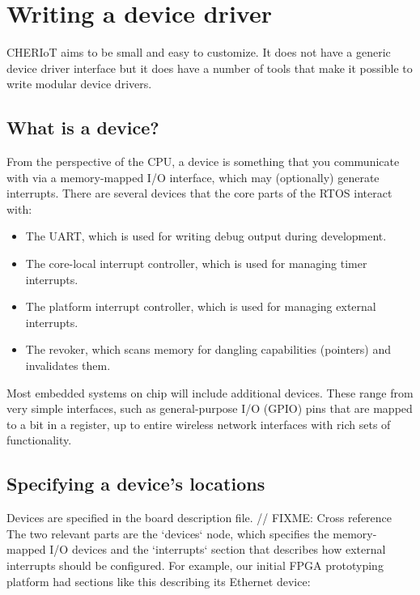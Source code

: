 \chapter{Writing a device driver}

CHERIoT aims to be small and easy to customize.
It does not have a generic device driver interface but it does have a number of tools that make it possible to write modular device drivers.

\section{What is a device?}

From the perspective of the CPU, a device is something that you communicate with via a memory-mapped I/O interface, which may (optionally) generate interrupts.
There are several devices that the core parts of the RTOS interact with:

\begin{itemize}
	\item{The UART, which is used for writing debug output during development.}
	\item{The core-local interrupt controller, which is used for managing timer interrupts.}
	\item{The platform interrupt controller, which is used for managing external interrupts.}
	\item{The revoker, which scans memory for dangling capabilities (pointers) and invalidates them.}
\end{itemize}

Most embedded systems on chip will include additional devices.
These range from very simple interfaces, such as general-purpose I/O (GPIO) pins that are mapped to a bit in a register, up to entire wireless network interfaces with rich sets of functionality.

\section{Specifying a device's locations}

Devices are specified in the board description file.
// FIXME: Cross reference
The two relevant parts are the `devices` node, which specifies the memory-mapped I/O devices and the `interrupts` section that describes how external interrupts should be configured.
For example, our initial FPGA prototyping platform had sections like this describing its Ethernet device:

\begin{jsonsnippet}
    "devices" : {
        "ethernet" : {
            "start" : 0x98000000,
            "length": 0x204
        \},
        ...
    \},
    "interrupts": [
        {
            "name": "Ethernet",
            "number": 16,
            "priority": 3
        \}
    ],
\end{jsonsnippet}

